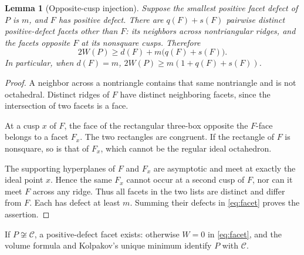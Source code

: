 \documentclass[11pt]{article}
\newtheorem{lemma}[theorem]{Lemma}
\theoremstyle{remark}
\newcommand{\CELL}{\mathcal C}
\begin{document}
\begin{lemma}[Opposite-cusp injection]\label{lem:injection}
Suppose the smallest positive facet defect of $P$ is $m$, and $F$ has
positive defect. There are $q(F)+s(F)$ pairwise distinct positive-defect
facets other than $F$: its neighbors across nontriangular ridges, and
the facets opposite $F$ at its nonsquare cusps. Therefore
\begin{equation}\label{eq:budget}
 2W(P)\ge d(F)+m\bigl(q(F)+s(F)\bigr).
\end{equation}
In particular, when $d(F)=m$,
$2W(P)\ge m(1+q(F)+s(F))$.
\end{lemma}
\begin{proof}
A neighbor across a nontriangle contains that same nontriangle and is
not octahedral. Distinct ridges of $F$ have distinct neighboring facets,
since the intersection of two facets is a face.

At a cusp $x$ of $F$, the face of the rectangular three-box opposite
the $F$-face belongs to a facet $F_x$. The two rectangles are congruent.
If the rectangle of $F$ is nonsquare, so is that of $F_x$, which cannot
be the regular ideal octahedron.

The supporting hyperplanes of $F$ and $F_x$ are asymptotic and meet
at exactly the ideal point $x$. Hence the same $F_x$ cannot occur at
a second cusp of $F$, nor can it meet $F$ across any ridge. Thus all
facets in the two lists are distinct and differ from $F$. Each has
defect at least $m$. Summing their defects in \eqref{eq:facet} proves
the assertion.
\end{proof}

If $P\not\cong\CELL$, a positive-defect facet exists: otherwise $W=0$
in \eqref{eq:facet}, and the volume formula and Kolpakov's unique
minimum identify $P$ with $\CELL$.
\end{document}
